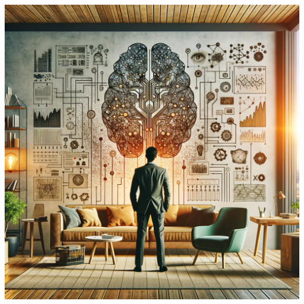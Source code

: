 \documentclass{beamer}
\theoremstyle{definition}
\begin{document}
\begin{frame}[plain]
\maketitle\hfill\\[-3cm]
\centering	
\includegraphics[width=0.6\linewidth]{end.png}
\end{frame}
\end{document}
